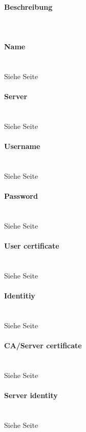 \begin{minipage}[t]{0.5\textwidth}
\vspace{0pt}
\paragraph{Beschreibung}\mbox{}\\
\paragraph{Name}\mbox{}\\
Siehe Seite \pageref{name} \\

\paragraph{Server}\mbox{}\\
Siehe Seite \pageref{server} \\

\paragraph{Username}\mbox{}\\
Siehe Seite \pageref{username} \\

\paragraph{Password}\mbox{}\\
Siehe Seite \pageref{password} \\

\paragraph{User certificate}\mbox{}\\
Siehe Seite \pageref{usercertificate} \\

\paragraph{Identitiy}\mbox{}\\
Siehe Seite \pageref{identitiy} \\

\paragraph{CA/Server certificate}\mbox{}\\
Siehe Seite \pageref{servercertificate} \\

\paragraph{Server identity}\mbox{}\\
Siehe Seite \pageref{serveridentitiy} \\

\end{minipage}
\newpage

